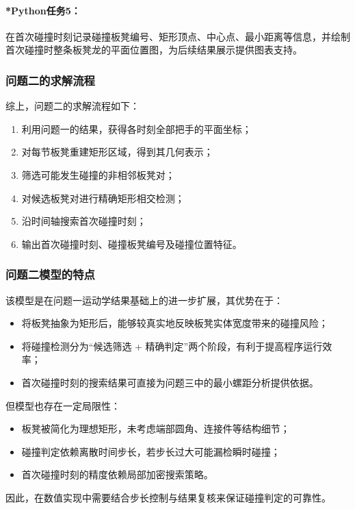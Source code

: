 \documentclass[12pt,a4paper]{ctexart}
\begin{document}
\paragraph{*Python任务5：}
在首次碰撞时刻记录碰撞板凳编号、矩形顶点、中心点、最小距离等信息，并绘制首次碰撞时整条板凳龙的平面位置图，为后续结果展示提供图表支持。

\subsubsection{问题二的求解流程}
综上，问题二的求解流程如下：

\begin{enumerate}
    \item 利用问题一的结果，获得各时刻全部把手的平面坐标；
    \item 对每节板凳重建矩形区域，得到其几何表示；
    \item 筛选可能发生碰撞的非相邻板凳对；
    \item 对候选板凳对进行精确矩形相交检测；
    \item 沿时间轴搜索首次碰撞时刻；
    \item 输出首次碰撞时刻、碰撞板凳编号及碰撞位置特征。
\end{enumerate}

\subsubsection{问题二模型的特点}
该模型是在问题一运动学结果基础上的进一步扩展，其优势在于：
\begin{itemize}
    \item 将板凳抽象为矩形后，能够较真实地反映板凳实体宽度带来的碰撞风险；
    \item 将碰撞检测分为“候选筛选 + 精确判定”两个阶段，有利于提高程序运行效率；
    \item 首次碰撞时刻的搜索结果可直接为问题三中的最小螺距分析提供依据。
\end{itemize}

但模型也存在一定局限性：
\begin{itemize}
    \item 板凳被简化为理想矩形，未考虑端部圆角、连接件等结构细节；
    \item 碰撞判定依赖离散时间步长，若步长过大可能漏检瞬时碰撞；
    \item 首次碰撞时刻的精度依赖局部加密搜索策略。
\end{itemize}

因此，在数值实现中需要结合步长控制与结果复核来保证碰撞判定的可靠性。
\end{document}
